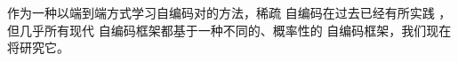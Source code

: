 \documentclass[../../book-main_zh.tex]{subfiles}
\begin{document}
作为一种以端到端方式学习自编码对的方法，稀疏
自编码在过去已经有所实践
\cite{Ranzato2006-oq,10.5555/3042573.3042641}，但几乎所有现代
自编码框架都基于一种不同的、概率性的
自编码框架，我们现在将研究它。
\end{document}
